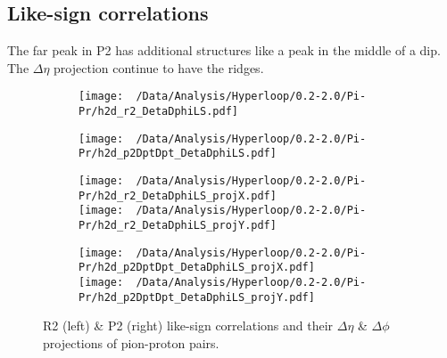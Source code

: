 \documentclass[12pt,a4paper,twoside]{report}
\begin{document}
\subsection{Like-sign correlations}
The far peak in P2 has additional structures like a peak in the middle of a dip. The $\Delta\eta$ projection continue to have the ridges.
\begin{figure}[H]
	\begin{subfigure}{0.49\linewidth}
		\texttt{[image: ~/Data/Analysis/Hyperloop/0.2-2.0/Pi-Pr/h2d\_r2\_DetaDphiLS.pdf]}\\
	\end{subfigure}
	\begin{subfigure}{0.49\linewidth}
		\texttt{[image: ~/Data/Analysis/Hyperloop/0.2-2.0/Pi-Pr/h2d\_p2DptDpt\_DetaDphiLS.pdf]}\\
	\end{subfigure}
\end{figure}
\begin{figure}[H]
	\ContinuedFloat
	\begin{subfigure}{0.49\linewidth}
		\texttt{[image: ~/Data/Analysis/Hyperloop/0.2-2.0/Pi-Pr/h2d\_r2\_DetaDphiLS\_projX.pdf]}\\
		\texttt{[image: ~/Data/Analysis/Hyperloop/0.2-2.0/Pi-Pr/h2d\_r2\_DetaDphiLS\_projY.pdf]}\\
	\end{subfigure}
	\begin{subfigure}{0.49\linewidth}
		\texttt{[image: ~/Data/Analysis/Hyperloop/0.2-2.0/Pi-Pr/h2d\_p2DptDpt\_DetaDphiLS\_projX.pdf]}\\
		\texttt{[image: ~/Data/Analysis/Hyperloop/0.2-2.0/Pi-Pr/h2d\_p2DptDpt\_DetaDphiLS\_projY.pdf]}\\
	\end{subfigure}
	\caption{R2 (left) \& P2 (right) like-sign correlations and their $\Delta\eta$ \& $\Delta\phi$ projections of pion-proton pairs.}
\end{figure}
\end{document}
